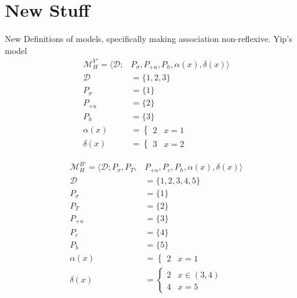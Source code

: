 \documentclass{article}
\begin{document}
\section{New Stuff}
New Definitions of models, specifically making association non-reflexive. 
Yip's model
\begin{equation}
\begin{split}
\mathcal{M}^{Y'}_{H} = \langle \mathcal{D}; &P_{\sigma}, P_{+u}, P_{h}, \alpha(x), \delta(x) \rangle \\
\mathcal{D} &= \{1, 2, 3\} \\
P_{\sigma} &= \{1\} \\
P_{+u} &= \{2\} \\
P_{h} &= \{3\} \\
\alpha(x) &= \begin{cases} 2 & x=1 \end{cases} \\
\delta(x) &= \begin{cases} 3 & x = 2 \end{cases} 
\end{split}
\end{equation}

\begin{equation}
\begin{split}
\mathcal{M}^{B'}_{H} = \langle \mathcal{D}; P_{\sigma}, P_{T}, &P_{+u}, P_{c}, P_{h}, \alpha(x), \delta(x) \rangle \\
\mathcal{D} &= \{1, 2, 3, 4, 5\} \\
P_{\sigma} &= \{1\} \\
P_{T} &= \{2\} \\
P_{+u} &= \{3\} \\
P_{c} &= \{4\} \\
P_{h} &= \{5\} \\
\alpha(x) &= \begin{cases} 2 & x=1 \end{cases} \\
\delta(x) &= \begin{cases} 2 & x\in(3,4) \\
				     4 & x=5 \end{cases} \\
\end{split}
\end{equation}
\end{document}
